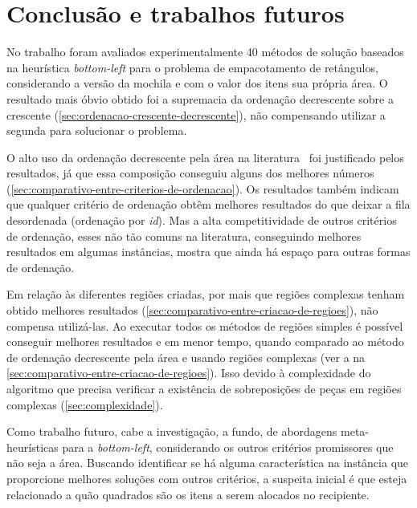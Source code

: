 \chapter*[Conclusão e trabalhos futuros]{Conclusão e trabalhos futuros}\label{ch:conclusao}

No trabalho foram avaliados experimentalmente 40 métodos de solução baseados na heurística
\textit{bottom-left} para o problema de empacotamento de retângulos, considerando a versão da
mochila e com o valor dos itens sua própria área.
O resultado mais óbvio obtido foi a supremacia da ordenação decrescente sobre a crescente
(\cref{sec:ordenacao-crescente-decrescente}), não compensando utilizar a segunda para solucionar o
problema.

O alto uso da ordenação decrescente pela área na literatura~\cite{chen2019efficient} foi justificado
pelos resultados, já que essa composição conseguiu alguns dos melhores números
(\cref{sec:comparativo-entre-criterios-de-ordenacao}).
Os resultados também indicam que qualquer critério de ordenação obtêm melhores resultados do que
deixar a fila desordenada (ordenação por \textit{id}).
Mas a alta competitividade de outros critérios de ordenação, esses não tão comuns na literatura,
conseguindo melhores resultados em algumas instâncias, mostra que ainda há espaço para outras
formas de ordenação.

Em relação às diferentes regiões criadas, por mais que regiões complexas tenham obtido melhores
resultados (\cref{sec:comparativo-entre-criacao-de-regioes}), não compensa utilizá-las.
Ao executar todos os métodos de regiões simples é possível conseguir melhores resultados e em menor
tempo, quando comparado ao método de ordenação decrescente pela área e usando regiões complexas
(ver a  na \cref{sec:comparativo-entre-criacao-de-regioes}).
Isso devido à complexidade do algoritmo que precisa verificar a existência de sobreposições de peças
em regiões complexas (\cref{sec:complexidade}).

Como trabalho futuro, cabe a investigação, a fundo, de abordagens meta-heurísticas para a
\textit{bottom-left}, considerando os outros critérios promissores que não seja a área.
Buscando identificar se há alguma característica na instância que proporcione melhores soluções com
outros critérios, a suspeita inicial é que esteja relacionado a quão quadrados são os itens a serem
alocados no recipiente.

